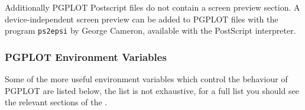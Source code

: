 \documentclass[twoside,11pt]{starlink}
\begin{document}
Additionally PGPLOT Postscript files do not contain a screen preview
section. A device-independent screen preview can be added to PGPLOT
files with the program \texttt{ps2epsi} by George Cameron, available with
the
PostScript interpreter.

\subsubsection{PGPLOT Environment Variables}

Some of the more useful environment variables which control the
behaviour of PGPLOT are listed below, the list is not exhaustive, for
a full list you should see the relevant sections of the
.
\end{document}

